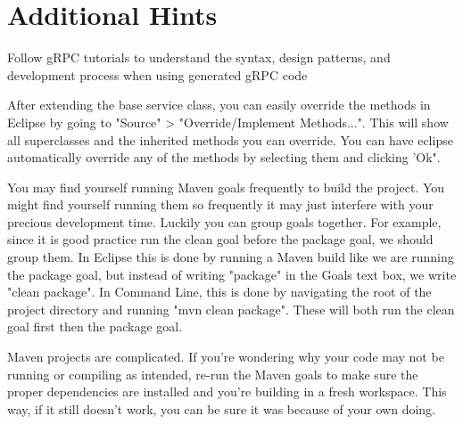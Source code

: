 \documentclass{article}
\begin{document}
\section{Additional Hints} %
\begin{info}
Follow gRPC tutorials to understand the syntax, design patterns, and development process when using generated gRPC code 
\end{info}
\begin{info}
After extending the base service class, you can easily override the methods in Eclipse by going to "Source" > "Override/Implement Methods...". This will show all superclasses and the inherited methods you can override. You can have eclipse automatically override any of the methods by selecting them and clicking 'Ok".
\end{info}
\begin{info}
You may find yourself running Maven goals frequently to build the project. You might find yourself running them so frequently it may just interfere with your precious development time. Luckily you can group goals together. For example, since it is good practice run the clean goal before the package goal, we should group them. In Eclipse this is done by running a Maven build like we are running the package goal, but instead of writing "package" in the Goals text box, we write "clean package". In Command Line, this is done by navigating the root of the project directory and running "mvn clean package". These will both run the clean goal first then the package goal. 
\end{info}
\begin{info}
Maven projects are complicated. If you're wondering why your code may not be running or compiling as intended, re-run the Maven goals to make sure the proper dependencies are installed and you're building in a fresh workspace. This way, if it still doesn't work, you can be sure it was because of your own doing.
\end{info}



\end{document}
